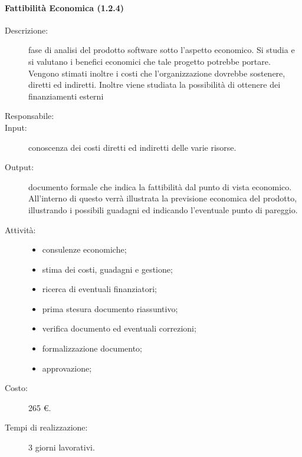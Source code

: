 \paragraph{Fattibilità Economica (1.2.4)}
\begin{description}
\item[Descrizione:] fase di analisi del prodotto software sotto l'aspetto economico. Si studia e si valutano i benefici economici che tale progetto potrebbe portare. Vengono stimati inoltre i costi che l'organizzazione dovrebbe sostenere, diretti ed indiretti. Inoltre viene studiata la possibilità di ottenere dei finanziamenti esterni 
\item[Responsabile:] 
\item[Input:] conoscenza dei costi diretti ed indiretti delle varie risorse.
\item[Output:] documento formale che indica la fattibilità dal punto di vista economico. All'interno di questo verrà illustrata la previsione economica del prodotto, illustrando i possibili guadagni ed indicando l'eventuale punto di pareggio.
\item[Attività:] 
\begin{center}
\begin{itemize}
\item consulenze economiche;
\item stima dei costi, guadagni e gestione;
\item ricerca di eventuali finanziatori;
\item prima stesura documento riassuntivo;
\item verifica documento ed eventuali correzioni;
\item formalizzazione documento;
\item approvazione;
\end{itemize}
\end{center}
\item[Costo:] 265 \euro.
\item[Tempi di realizzazione:] 3 giorni lavorativi.
\end{description}

